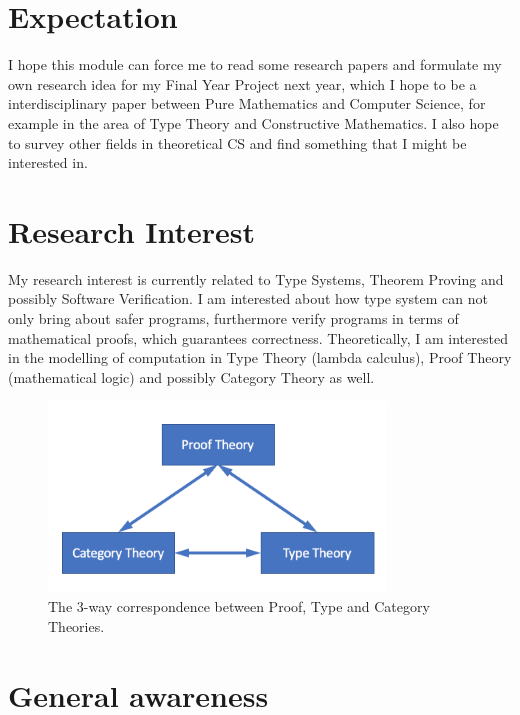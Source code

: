 \documentclass{article}
\title{\mytitle}
\author{\myname}
\date{\today}
\theoremstyle{plain}
\begin{document}
\maketitle
\section{Expectation}
I hope this module can force me to read some research papers and formulate my
own research idea for my Final Year Project next year, which I hope to be a
interdisciplinary paper between Pure Mathematics and Computer Science, for
example in the area of Type Theory and Constructive Mathematics. I also hope to
survey other fields in theoretical CS and find something that I might be
interested in.

\section{Research Interest}
My research interest is currently related to Type Systems, Theorem Proving and
possibly Software Verification. I am interested about how type system can not
only bring about safer programs, furthermore verify programs in terms of
mathematical proofs, which guarantees correctness. Theoretically, I am
interested in the modelling of computation in Type Theory (lambda calculus),
Proof Theory (mathematical logic) and possibly Category Theory as well.

\begin{figure}[h]
\centering
\includegraphics[width=0.8\textwidth]{type-proof-cat.png}
\caption{The 3-way correspondence between Proof, Type and Category Theories.}
\end{figure}

\section{General awareness}
\end{document}
